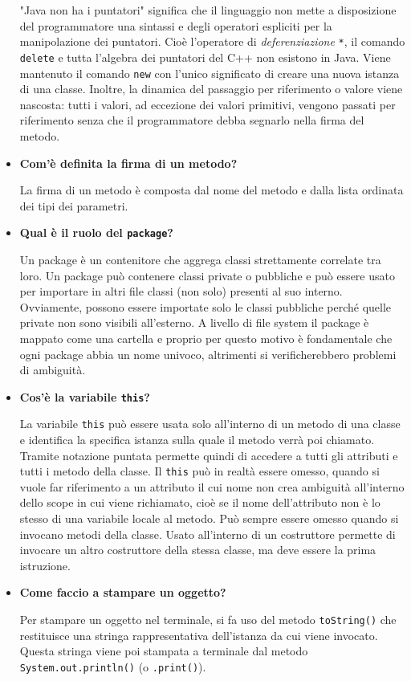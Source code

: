 \documentclass[12pt, a4paper]{article}
\begin{document}
\begin{itemize}
    "Java non ha i puntatori" significa che il linguaggio non mette a disposizione
    del programmatore una sintassi e degli operatori espliciti per la manipolazione
    dei puntatori. Cioè l'operatore di \emph{deferenziazione} \texttt{*}, il comando
    \texttt{delete} e tutta l'algebra dei puntatori del C++ non esistono in Java.
    Viene mantenuto il comando \texttt{new} con l'unico significato di creare una
    nuova istanza di una classe. Inoltre, la dinamica del passaggio per riferimento
    o valore viene nascosta: tutti i valori, ad eccezione dei valori primitivi,
    vengono passati per riferimento senza che il programmatore debba segnarlo
    nella firma del metodo.
    \item \textbf{Com'è definita la firma di un metodo?}
    
    La firma di un metodo è composta dal nome del metodo e dalla lista ordinata
    dei tipi dei parametri.
    \item \textbf{Qual è il ruolo del \texttt{package}?}
    
    Un package è un contenitore che aggrega classi strettamente correlate tra loro.
    Un package può contenere classi private o pubbliche e può essere usato per
    importare in altri file classi (non solo) presenti al suo interno.
    Ovviamente, possono essere importate solo le classi pubbliche perché quelle
    private non sono visibili all'esterno. A livello di file system il package è
    mappato come una cartella e proprio per questo motivo è fondamentale che ogni
    package abbia un nome univoco, altrimenti si verificherebbero problemi di ambiguità.
    \item \textbf{Cos'è la variabile \texttt{this}?}
    
    La variabile \texttt{this} può essere usata solo all'interno di un metodo di una
    classe e identifica la specifica istanza sulla quale il metodo verrà poi
    chiamato. Tramite notazione puntata permette quindi di accedere a tutti gli
    attributi e tutti i metodo della classe. Il \texttt{this} può in realtà essere
    omesso, quando si vuole far riferimento a un attributo il cui nome non crea
    ambiguità all'interno dello scope in cui viene richiamato, cioè se il nome
    dell'attributo non è lo stesso di una variabile locale al metodo.
    Può sempre essere omesso quando si invocano metodi della classe. Usato all'interno
    di un costruttore permette di invocare un altro costruttore della stessa classe,
    ma deve essere la prima istruzione.
    \item \textbf{Come faccio a stampare un oggetto?}
    
    Per stampare un oggetto nel terminale, si fa uso del metodo \texttt{toString()}
    che restituisce una stringa rappresentativa dell'istanza da cui viene invocato.
    Questa stringa viene poi stampata a terminale dal metodo \texttt{System.out.println()}
    (o \texttt{.print()}).
\end{itemize}
\end{document}
